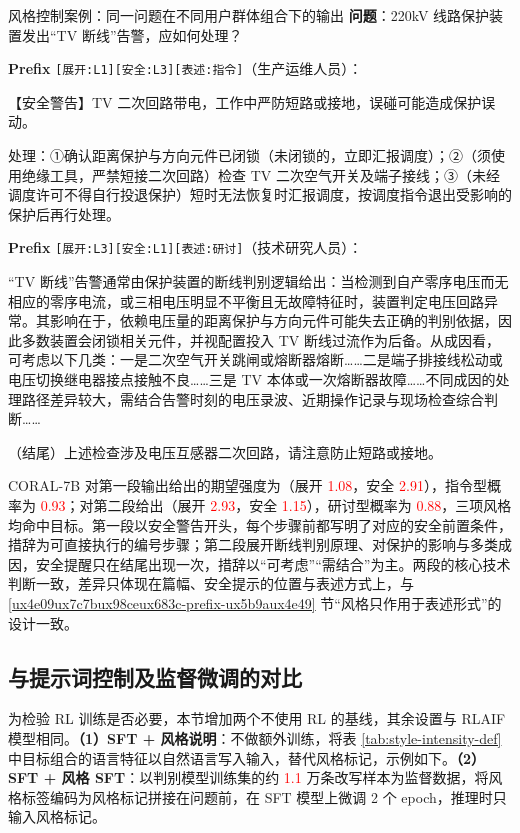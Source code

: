 \documentclass[fontset=fandol,type=master,campus=shenzhen,etitleauto=true]{hithesisbook}
\newcommand{\rev}[1]{\textcolor{red}{#1}}
\begin{document}
\begin{promptbox}{风格控制案例：同一问题在不同用户群体组合下的输出}
\textbf{问题}：220kV 线路保护装置发出“TV 断线”告警，应如何处理？\par\smallskip
\textbf{Prefix} \texttt{[展开:L1][安全:L3][表述:指令]}（生产运维人员）：\par
【安全警告】TV 二次回路带电，工作中严防短路或接地，误碰可能造成保护误动。\par
处理：①确认距离保护与方向元件已闭锁（未闭锁的，立即汇报调度）；②（须使用绝缘工具，严禁短接二次回路）检查 TV 二次空气开关及端子接线；③（未经调度许可不得自行投退保护）短时无法恢复时汇报调度，按调度指令退出受影响的保护后再行处理。\par\smallskip
\textbf{Prefix} \texttt{[展开:L3][安全:L1][表述:研讨]}（技术研究人员）：\par
“TV 断线”告警通常由保护装置的断线判别逻辑给出：当检测到自产零序电压而无相应的零序电流，或三相电压明显不平衡且无故障特征时，装置判定电压回路异常。其影响在于，依赖电压量的距离保护与方向元件可能失去正确的判别依据，因此多数装置会闭锁相关元件，并视配置投入 TV 断线过流作为后备。从成因看，可考虑以下几类：一是二次空气开关跳闸或熔断器熔断……二是端子排接线松动或电压切换继电器接点接触不良……三是 TV 本体或一次熔断器故障……不同成因的处理路径差异较大，需结合告警时刻的电压录波、近期操作记录与现场检查综合判断……\par
（结尾）上述检查涉及电压互感器二次回路，请注意防止短路或接地。
\end{promptbox}

CORAL-7B 对第一段输出给出的期望强度为（展开 \rev{1.08}，安全 \rev{2.91}），指令型概率为 \rev{0.93}；对第二段给出（展开 \rev{2.93}，安全 \rev{1.15}），研讨型概率为 \rev{0.88}，三项风格均命中目标。第一段以安全警告开头，每个步骤前都写明了对应的安全前置条件，措辞为可直接执行的编号步骤；第二段展开断线判别原理、对保护的影响与多类成因，安全提醒只在结尾出现一次，措辞以“可考虑”“需结合”为主。两段的核心技术判断一致，差异只体现在篇幅、安全提示的位置与表述方式上，与 \ref{ux4e09ux7c7bux98ceux683c-prefix-ux5b9aux4e49} 节“风格只作用于表述形式”的设计一致。

\subsection{与提示词控制及监督微调的对比}\label{subsec:prompt-baseline}

为检验 RL 训练是否必要，本节增加两个不使用 RL 的基线，其余设置与 RLAIF 模型相同。\textbf{（1）SFT + 风格说明}：不做额外训练，将表 \ref{tab:style-intensity-def} 中目标组合的语言特征以自然语言写入输入，替代风格标记，示例如下。\textbf{（2）SFT + 风格 SFT}：以判别模型训练集的约 \rev{1.1} 万条改写样本为监督数据，将风格标签编码为风格标记拼接在问题前，在 SFT 模型上微调 2 个 epoch，推理时只输入风格标记。
\end{document}
